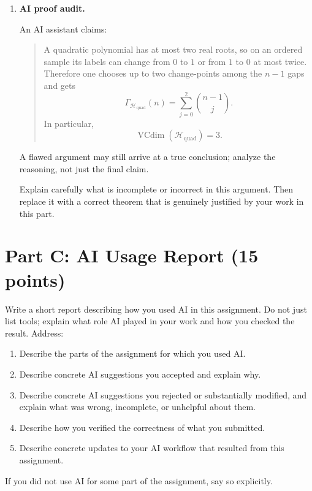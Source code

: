 \documentclass{article}
\begin{document}
\begin{enumerate}
Then compare your exact growth formula with the Sauer--Shelah bound obtained from your VC-dimension calculation. Is the VC-based upper bound tight here? Explain what your answer says about VC dimension as a summary of finite-pool richness.

\item \textbf{AI proof audit.}

An AI assistant claims:

\begin{quote}
A quadratic polynomial has at most two real roots, so on an ordered sample its labels can change from $0$ to $1$ or from $1$ to $0$ at most twice. Therefore one chooses up to two change-points among the $n-1$ gaps and gets
$$
\Gamma_{\mathcal{H}_{\mathrm{quad}}}(n)
=
\sum_{j=0}^2 \binom{n-1}{j}.
$$
In particular,
$$
\operatorname{VCdim}(\mathcal{H}_{\mathrm{quad}}) = 3.
$$
\end{quote}

A flawed argument may still arrive at a true conclusion; analyze the reasoning, not just the final claim.

Explain carefully what is incomplete or incorrect in this argument. Then replace it with a correct theorem that is genuinely justified by your work in this part.
\end{enumerate}

\section{Part C: AI Usage Report (15 points)}

Write a short report describing how you used AI in this assignment. Do not just list tools; explain what role AI played in your work and how you checked the result. Address:
\begin{enumerate}
\item Describe the parts of the assignment for which you used AI.
\item Describe concrete AI suggestions you accepted and explain why.
\item Describe concrete AI suggestions you rejected or substantially modified, and explain what was wrong, incomplete, or unhelpful about them.
\item Describe how you verified the correctness of what you submitted.
\item Describe concrete updates to your AI workflow that resulted from this assignment.
\end{enumerate}

If you did not use AI for some part of the assignment, say so explicitly.
\end{document}

